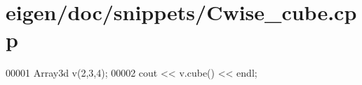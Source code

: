 \hypertarget{eigen_2doc_2snippets_2_cwise__cube_8cpp_source}{}\section{eigen/doc/snippets/\+Cwise\+\_\+cube.cpp}
\label{eigen_2doc_2snippets_2_cwise__cube_8cpp_source}

\begin{DoxyCode}
00001 Array3d v(2,3,4);
00002 cout << v.cube() << endl;
\end{DoxyCode}
